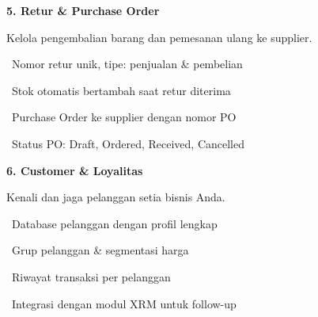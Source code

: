 \documentclass[a4paper]{article}
\begin{document}
\vspace{8pt}

\noindent
\begin{minipage}[t]{0.485\textwidth}
    \colorbox{OrangePrimary}{%
        \begin{minipage}{\dimexpr\textwidth-2\fboxsep\relax}
            {\fontsize{10}{13}\selectfont\bfseries\color{White} 5. Retur \& Purchase Order}
        \end{minipage}}\par
    \vspace{4pt}
    {\fontsize{9}{12}\selectfont\color{TextDark}%
    Kelola pengembalian barang dan pemesanan ulang ke supplier.\par\vspace{3pt}
    \textbullet\ Nomor retur unik, tipe: penjualan \& pembelian\par\vspace{2pt}%
    \textbullet\ Stok otomatis bertambah saat retur diterima\par\vspace{2pt}%
    \textbullet\ Purchase Order ke supplier dengan nomor PO\par\vspace{2pt}%
    \textbullet\ Status PO: Draft, Ordered, Received, Cancelled}%
\end{minipage}%
\hfill
\begin{minipage}[t]{0.485\textwidth}
    \colorbox{EmeraldDark}{%
        \begin{minipage}{\dimexpr\textwidth-2\fboxsep\relax}
            {\fontsize{10}{13}\selectfont\bfseries\color{White} 6. Customer \& Loyalitas}
        \end{minipage}}\par
    \vspace{4pt}
    {\fontsize{9}{12}\selectfont\color{TextDark}%
    Kenali dan jaga pelanggan setia bisnis Anda.\par\vspace{3pt}
    \textbullet\ Database pelanggan dengan profil lengkap\par\vspace{2pt}%
    \textbullet\ Grup pelanggan \& segmentasi harga\par\vspace{2pt}%
    \textbullet\ Riwayat transaksi per pelanggan\par\vspace{2pt}%
    \textbullet\ Integrasi dengan modul XRM untuk follow-up}%
\end{minipage}
\end{document}
